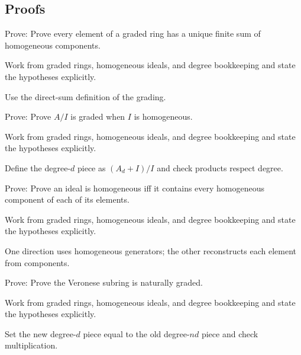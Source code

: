 \subsection*{Proofs}

\begin{exercise}\label{exr:vi34-expand-06}
Prove: Prove every element of a graded ring has a unique finite sum of homogeneous components.
\end{exercise}
\begin{hint}
Work from graded rings, homogeneous ideals, and degree bookkeeping and state the hypotheses explicitly.
\end{hint}
\begin{solution}
Use the direct-sum definition of the grading.
\end{solution}

\begin{exercise}\label{exr:vi34-expand-07}
Prove: Prove $A/I$ is graded when $I$ is homogeneous.
\end{exercise}
\begin{hint}
Work from graded rings, homogeneous ideals, and degree bookkeeping and state the hypotheses explicitly.
\end{hint}
\begin{solution}
Define the degree-$d$ piece as $(A_d+I)/I$ and check products respect degree.
\end{solution}

\begin{exercise}\label{exr:vi34-expand-08}
Prove: Prove an ideal is homogeneous iff it contains every homogeneous component of each of its elements.
\end{exercise}
\begin{hint}
Work from graded rings, homogeneous ideals, and degree bookkeeping and state the hypotheses explicitly.
\end{hint}
\begin{solution}
One direction uses homogeneous generators; the other reconstructs each element from components.
\end{solution}

\begin{exercise}\label{exr:vi34-expand-09}
Prove: Prove the Veronese subring is naturally graded.
\end{exercise}
\begin{hint}
Work from graded rings, homogeneous ideals, and degree bookkeeping and state the hypotheses explicitly.
\end{hint}
\begin{solution}
Set the new degree-$d$ piece equal to the old degree-$nd$ piece and check multiplication.
\end{solution}

